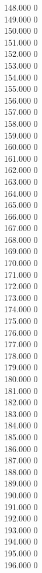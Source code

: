 { 148.000	0 \\
 149.000	0 \\
 150.000	0 \\
 151.000	0 \\
 152.000	0 \\
 153.000	0 \\
 154.000	0 \\
 155.000	0 \\
 156.000	0 \\
 157.000	0 \\
 158.000	0 \\
 159.000	0 \\
 160.000	0 \\
 161.000	0 \\
 162.000	0 \\
 163.000	0 \\
 164.000	0 \\
 165.000	0 \\
 166.000	0 \\
 167.000	0 \\
 168.000	0 \\
 169.000	0 \\
 170.000	0 \\
 171.000	0 \\
 172.000	0 \\
 173.000	0 \\
 174.000	0 \\
 175.000	0 \\
 176.000	0 \\
 177.000	0 \\
 178.000	0 \\
 179.000	0 \\
 180.000	0 \\
 181.000	0 \\
 182.000	0 \\
 183.000	0 \\
 184.000	0 \\
 185.000	0 \\
 186.000	0 \\
 187.000	0 \\
 188.000	0 \\
 189.000	0 \\
 190.000	0 \\
 191.000	0 \\
 192.000	0 \\
 193.000	0 \\
 194.000	0 \\
 195.000	0 \\
 196.000	0 \\
}
